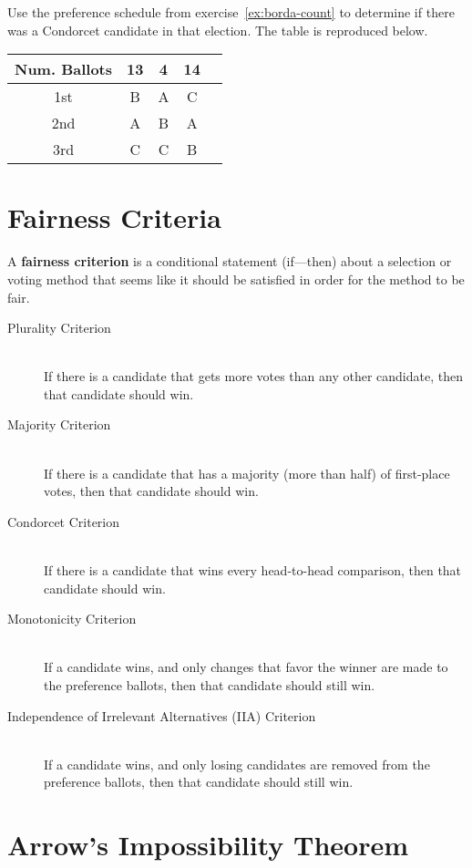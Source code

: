 \begin{exercise}\label{ex:copeland}
  Use the preference schedule from exercise~\ref{ex:borda-count} to
  determine if there was a Condorcet candidate in that election. The
  table is reproduced below.
  \begin{center}
    \begin{tabular}{ccccc}
      \toprule
      Num. Ballots & 13 & 4 & 14 \\
      \midrule
      1st & B & A & C \\
      2nd & A & B & A \\
      3rd & C & C & B \\
      \bottomrule
    \end{tabular}
  \end{center}

\end{exercise}



\section{Fairness Criteria}%
\label{sec:fairness criteria}

\begin{definition}
  A \textbf{fairness criterion} is a conditional statement (if---then)
  about a selection or voting method that seems like it should be
  satisfied in order for the method to be fair.
\end{definition}

\begin{description}
\item[Plurality Criterion] \hfill \\
  If there is a candidate that gets more votes than any other
  candidate, then that candidate should win.
\item[Majority Criterion] \hfill \\
  If there is a candidate that has a majority (more than half) of
  first-place votes, then that candidate should win.
\item[Condorcet Criterion] \hfill \\
  If there is a candidate that wins every head-to-head comparison,
  then that candidate should win.
\item[Monotonicity Criterion] \hfill \\
  If a candidate wins, and only changes that favor the winner are made
  to the preference ballots, then that candidate should still win.
\item[Independence of Irrelevant Alternatives (IIA) Criterion] \hfill \\
  If a candidate wins, and only losing candidates are removed from the
  preference ballots, then that candidate should still win.
\end{description}


\section{Arrow's Impossibility Theorem}%
\label{sec:arrows-impossibility-thm}





